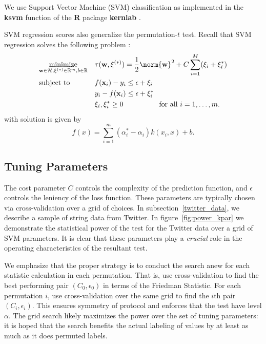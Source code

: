 We use Support Vector Machine (SVM) classification 
as implemented in the {\bf ksvm} function of the {\bf R}
\cite{cran} package {\bf kernlab} \cite{kernlab}.

SVM regression scores also generalize the permutation-$t$ test.
Recall that SVM regression solves the following problem \cite{scholkopf2002learning}:
\begin{equation*}
\begin{aligned}
& \underset{\mathbf{w}\in\mathcal{H},\mathbf{\xi}^{(*)}\in\mathbb{R}^m,b\in\mathbb{R}}{\text{minimize}}
& &\tau(\mathbf{w},\mathbf{\xi}^{(*)})=\frac{1}{2}\norm{\mathbf{w}}^2+C\sum_{i=1}^M(\xi_i+\xi_i^*) \\
& \text{subject to}
& & f(\mathbf{x}_i)-y_i \leq \epsilon +\xi_i\\
&&& y_i-f(\mathbf{x}_i) \leq \epsilon+\xi_i^* \\
&&& \xi_i,\xi_i^*\geq0 \qquad \qquad \quad \text{for all } i=1,\ldots,m.
\end{aligned}
\end{equation*}
with solution is given by
\begin{equation*}
  f(x)=\sum_{i=1}^m(\alpha_i^*-\alpha_i)k(x_i,x)+b.
\end{equation*}
\subsection{Tuning Parameters}

The cost parameter $C$ controls the complexity of the prediction
function, and $\epsilon$ controls the leniency of the loss function.
These parameters are typically chosen via cross-validation over a grid
of choices.  In subsection~\ref{twitter_data}, we describe a sample of
string data from Twitter.  In figure~\ref{fig:power_kpar} we
demonstrate the statistical power of the test for the Twitter data
over a grid of SVM parameters.  It is clear that these parameters play
a \emph{crucial} role in the operating characteristics of the
resultant test.

We emphasize that the proper strategy is to conduct the search anew
for each statistic calculation in each permutation.  That is, use cross-validation to
find the best performing pair $(C_0, \epsilon_0)$ in terms of the
Friedman Statistic.  For each permutation $i$, use cross-validation
over the same grid to find the $i$th pair $(C_i, \epsilon_i)$.  This
ensures symmetry of protocol and enforces that the test have level
$\alpha$.  The grid search likely maximizes the power over the set of
tuning parameters: it is hoped that the search benefits the actual
labeling of values by at least as much as it does permuted labels.

